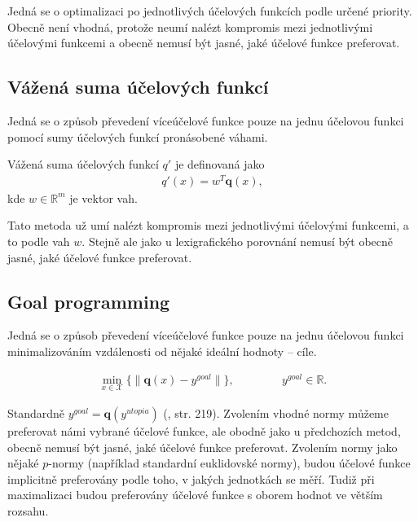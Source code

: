 Jedná se o optimalizaci po jednotlivých účelových funkcích podle určené priority. 
Obecně není vhodná, protože neumí nalézt kompromis mezi jednotlivými účelovými funkcemi a obecně nemusí být jasné, jaké účelové funkce preferovat.

\subsection{Vážená suma účelových funkcí}\label{kap:vazenaSumaUcelF}

Jedná se o způsob převedení víceúčelové funkce pouze na jednu účelovou funkci pomocí sumy účelových funkcí pronásobené váhami.

\begin{definice}\label{df:vazenaSumaUcelF}
  Vážená suma účelových funkcí $q'$ je definovaná jako
  \begin{align*}
    q'(x) = w^T \mathbf{q}(x),
  \end{align*}
  kde $w \in \mathbb{R}^m$ je vektor vah.
\end{definice}

Tato metoda už umí nalézt kompromis mezi jednotlivými účelovými funkcemi, a to podle vah $w$.
Stejně ale jako u lexigrafického porovnání nemusí být obecně jasné, jaké účelové funkce preferovat.

\subsection{Goal programming}\label{kap:goalP}

Jedná se o způsob převedení víceúčelové funkce pouze na jednu účelovou funkci minimalizováním vzdálenosti od nějaké ideální hodnoty -- cíle. 

\begin{definice}\label{df:goalP}
  \begin{align*}
    \min_{x \in \mathcal{X}} \{ \| \mathbf{q}(x) - y^{goal} \| \}, \hspace{50pt} y^{goal} \in \mathbb{R}.
  \end{align*}
\end{definice}

Standardně $y^{goal} = \mathbf{q}(y^{utopia})$ (\cite{AlgOptBook}, str. 219).
Zvolením vhodné normy můžeme preferovat námi vybrané účelové funkce, ale obodně jako u předchozích metod, obecně nemusí být jasné, jaké účelové funkce preferovat.
Zvolením normy jako nějaké $p$-normy (například standardní euklidovské normy), budou účelové funkce implicitně preferovány podle toho,
v jakých jednotkách se měří. Tudiž při maximalizaci budou preferovány účelové funkce s oborem hodnot ve větším rozsahu.

